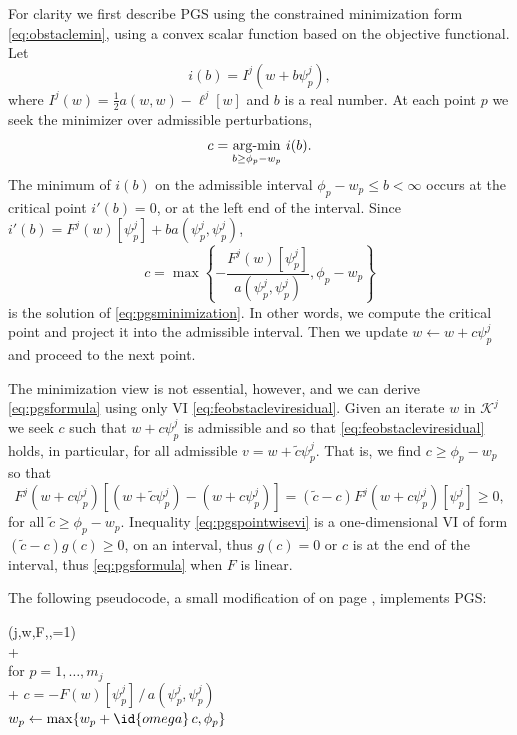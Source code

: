 \documentclass[letterpaper,final,12pt,reqno]{amsart}
\theoremstyle{claim}
\numberwithin{equation}{section}
\numberwithin{figure}{section}
\numberwithin{table}{section}
\numberwithin{theorem}{section}
\begin{document}
For clarity we first describe PGS using the constrained minimization form \eqref{eq:obstaclemin}, using a convex scalar function based on the objective functional.  Let
\begin{equation}
i(b) = I^j(w+b\psi_p^j),
\end{equation}
where $I^j(w) = \frac{1}{2} a(w,w) - \ell^j[w]$ and $b$ is a real number.  At each point $p$ we seek the minimizer over admissible perturbations,
\begin{equation}
  c = \mathop{\mathrm{arg\text{-}min}}_{b \ge \phi_p - w_p} \, i(b).  \label{eq:pgsminimization}
\end{equation}
The minimum of $i(b)$ on the admissible interval $\phi_p - w_p \le b < \infty$ occurs at the critical point $i'(b)=0$, or at the left end of the interval.  Since $i'(b) = F^j(w)[\psi_p^j] + b a(\psi_p^j,\psi_p^j)$,
\begin{equation}
  c = \max\left\{-\frac{F^j(w)[\psi_p^j]}{a(\psi_p^j,\psi_p^j)}, \phi_p - w_p\right\}  \label{eq:pgsformula}
\end{equation}
is the solution of \eqref{eq:pgsminimization}.  In other words, we compute the critical point and project it into the admissible interval.  Then we update $w \gets w + c\psi_p^j$ and proceed to the next point.

The minimization view is not essential, however, and we can derive \eqref{eq:pgsformula} using only VI \eqref{eq:feobstacleviresidual}.  Given an iterate $w$ in $\mathcal{K}^j$ we seek $c$ such that $w+c\psi_p^j$ is admissible and so that \eqref{eq:feobstacleviresidual} holds, in particular, for all admissible $v=w+\tilde c\psi_p^j$.  That is, we find $c\ge \phi_p-w_p$ so that
\begin{equation}
  F^j(w+c\psi_p^j)[(w+\tilde c\psi_p^j) - (w+c\psi_p^j)] = (\tilde c - c) F^j(w+c\psi_p^j)[\psi_p^j] \ge 0,  \label{eq:pgspointwisevi}
\end{equation}
for all $\tilde c\ge \phi_p-w_p$.  Inequality \eqref{eq:pgspointwisevi} is a one-dimensional VI of form $(\tilde c - c)g(c) \ge 0$, on an interval, thus $g(c)=0$ or $c$ is at the end of the interval, thus \eqref{eq:pgsformula} when $F$ is linear.

The following pseudocode, a small modification of  on page \pageref{ps:gs-sweep}, implements PGS:
\begin{pseudo*} \label{ps:pgs-sweep}
(j,w,F,\phi,=1)\text{:} \\+
     \\
    for $p=1,\dots,m_j$ \\+
        $c = -F(w)[\psi_p^j] \,\big/\, a(\psi_p^j,\psi_p^j)$ \\
        $w_p \gets \max\{w_p + \id{omega}\,c, \phi_p\}$
\end{pseudo*}
\end{document}
